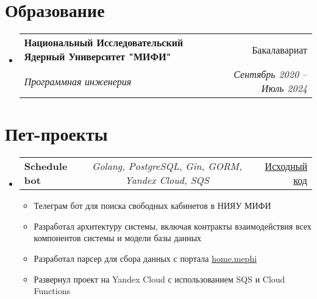 \documentclass[a4paper,11pt]{article}
\makeatletter
\newcommand{\resumeItem}[1]{
  \item\small{#1}
}
\newcommand{\resumeItemListStart}{\begin{itemize}[rightmargin=0.11in]}
\newcommand{\resumeItemListEnd}{\end{itemize}}
\newcommand{\resumeTrioHeading}[3]{
  \item\small{
    \begin{tabular*}{0.96\textwidth}[t]{
      l@{\extracolsep{\fill}}c@{\extracolsep{\fill}}r
    }
      \textbf{#1} & \textit{#2} & #3
    \end{tabular*}
  }
}
\newcommand{\resumeQuadHeading}[4]{
  \item
  \begin{tabular*}{0.96\textwidth}[t]{l@{\extracolsep{\fill}}r}
    \textbf{#1} & #2 \\
    \textit{\small#3} & \textit{\small #4} \\
  \end{tabular*}
}
\newcommand{\resumeQuadHeadingChild}[2]{
  \item
  \begin{tabular*}{0.96\textwidth}[t]{l@{\extracolsep{\fill}}r}
    \textbf{\small#1} & {\small#2} \\
  \end{tabular*}
}
\newcommand{\resumeHeadingListStart}{
  \begin{itemize}[leftmargin=0.15in, label={}]
}
\newcommand{\resumeHeadingListEnd}{\end{itemize}}
\makeatother
\begin{document}



\section{Образование}
  \resumeHeadingListStart{}
    \resumeQuadHeading{Национальный Исследовательский Ядерный Университет "МИФИ"}{Бакалавариат}
    {Программная инженерия}{Сентябрь 2020 -- Июль 2024}
  \resumeHeadingListEnd{}



\section{Пет-проекты}
\resumeHeadingListStart{}
      \resumeTrioHeading{Schedule bot}{Golang, PostgreSQL, Gin, GORM, Yandex Cloud, SQS}{\href{https://github.com/PotatoHD404/ParallelDB}{\uline{Исходный код}}}
      \resumeItemListStart{}
        \resumeItem{Телеграм бот для поиска свободных кабинетов в НИЯУ МИФИ}
        \resumeItem{Разработал архитектуру системы, включая контракты взаимодействия всех компонентов системы и модели базы данных}
        \resumeItem{Разработал парсер для сбора данных с портала \href{https://home.mephi.ru}{home.mephi}}
        \resumeItem{Развернул проект на Yandex Cloud с использованием SQS и Cloud Functions}
  \resumeHeadingListEnd{}
\resumeHeadingListEnd{}
\end{document}

